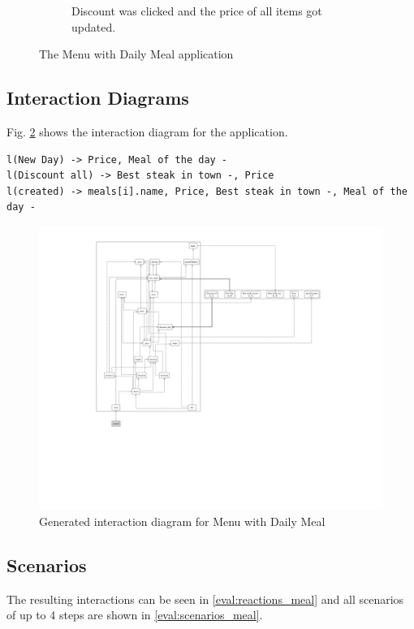 \begin{figure}[H]
\begin{subfigure}[t]{0.65\textwidth}
        \caption{Discount was clicked and the price of all items got updated.}
    \end{subfigure}
    \caption{The Menu with Daily Meal application }
    \label{fig:eval_image_meal}
\end{figure}
\newpage

\subsection{Interaction Diagrams}
Fig. \ref{fig:diagram_meal_list_properties} shows the interaction diagram for the application.

\label{eval:reactions_meal}
\begin{lstlisting}[language=JavaScriptPlain,caption = {Interactions of the Menu with Daily Meal application}, captionpos=b]
l(New Day) -> Price, Meal of the day -
l(Discount all) -> Best steak in town -, Price
l(created) -> meals[i].name, Price, Best steak in town -, Meal of the day -
\end{lstlisting}
\begin{figure}[H]
    \centering
    \includegraphics[width=\textwidth]{images/diagram_meal.png}
     \caption{Generated interaction diagram for Menu with Daily Meal}
     \label{fig:diagram_meal_list_properties}
\end{figure}

\subsection{Scenarios}
The resulting interactions can be seen in \ref{eval:reactions_meal} and all scenarios of up to 4 steps are shown in \ref{eval:scenarios_meal}.

